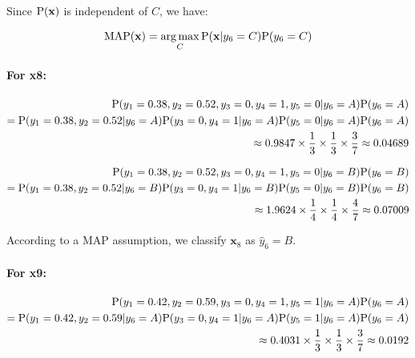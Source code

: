 \documentclass[12pt]{article}
\DeclareMathOperator*{\argmax}{arg\,max}
\begin{document}
\begin{enumerate}[leftmargin=\labelsep]
\begin{enumerate}
        Since $\textrm{P}(\textbf{x})$ is independent of $C$, we have:

        \begin{equation}
            \textrm{MAP}(\textbf{x}) = \argmax_C \prob(\textbf{x}|y_6 = C)\prob(y_6 = C)
        \end{equation}

        \paragraph{For x8:}

        \begin{equation}
        \begin{split}
            \textrm{P}(y_1 = 0.38, y_2 = 0.52, y_3 = 0, y_4 = 1, y_5 = 0|y_6 = A)\textrm{P}(y_6 = A)\\
            = \textrm{P}(y_1 = 0.38, y_2 = 0.52|y_6 = A)\textrm{P}(y_3 = 0, y_4 = 1|y_6 = A)\textrm{P}(y_5 = 0|y_6 = A)\textrm{P}(y_6 = A)\\
            \approx 0.9847 \times \frac{1}{3} \times \frac{1}{3} \times \frac{3}{7} \approx 0.04689
        \end{split}
        \end{equation}

        \begin{equation}
        \begin{split}
            \textrm{P}(y_1 = 0.38, y_2 = 0.52, y_3 = 0, y_4 = 1, y_5 = 0|y_6 = B)\textrm{P}(y_6 = B)\\
            = \textrm{P}(y_1 = 0.38, y_2 = 0.52|y_6 = B)\textrm{P}(y_3 = 0, y_4 = 1|y_6 = B)\textrm{P}(y_5 = 0|y_6 = B)\textrm{P}(y_6 = B)\\
            \approx 1.9624 \times \frac{1}{4} \times \frac{1}{4} \times \frac{4}{7} \approx 0.07009
        \end{split}
        \end{equation}

        According to a MAP assumption, we classify $\mathbf{x}_8$ as $\hat{y}_6 = B$.

        \paragraph{For x9:}

        \begin{equation}
        \begin{split}
            \textrm{P}(y_1 = 0.42, y_2 = 0.59, y_3 = 0, y_4 = 1, y_5 = 1|y_6 = A)\textrm{P}(y_6 = A)\\
            = \textrm{P}(y_1 = 0.42, y_2 = 0.59|y_6 = A)\textrm{P}(y_3 = 0, y_4 = 1|y_6 = A)\textrm{P}(y_5 = 1|y_6 = A)\textrm{P}(y_6 = A)\\
            \approx 0.4031 \times \frac{1}{3} \times \frac{1}{3} \times \frac{3}{7} \approx 0.0192
        \end{split}
        \end{equation}


\end{enumerate}
\end{enumerate}
\end{document}
